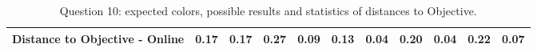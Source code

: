 \begin{table}[htbp]
{\begin{tabular}{lccccccccccccc}
    \multicolumn{4}{l}{Distance to Objective - Online}                                                                                               & \multicolumn{1}{|c}{0.17}        & \multicolumn{1}{c|}{0.17}    & \multicolumn{1}{|c}{0.27}        & \multicolumn{1}{c|}{0.09}    & \multicolumn{1}{|c}{\textbf{0.13}}       & \multicolumn{1}{c|}{0.04}    & \multicolumn{1}{|c}{0.20}        & \multicolumn{1}{c|}{0.04}    & \multicolumn{1}{|c}{0.22}       & \multicolumn{1}{c|}{0.07}    \\ \hline
    \end{tabular}}
  \caption[Question 10, with expected Results.]{Question 10: expected colors, possible results and statistics of distances to Objective.}
  \vspace{-5pt}
  \label{table:lab_q10_expected}
\end{table}
%
